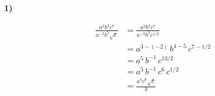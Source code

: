 \documentclass[11pt,a4paper,fleqn]{article}
\begin{document}
\textbf{1)}

\begin{align*}
  \frac{a^{3}b^{4}c^{7}}{a^{-2}b^{5}\sqrt{c}}
    &= \frac{a^{3}b^{4}c^{7}}{a^{-2}b^{5}c^{1/2}} \\
    &= a^{3-(-2)}\, b^{4-5}\, c^{7-1/2} \\
    &= a^{5}\, b^{-1}\, c^{13/2} \\
    &= a^{5}\, b^{-1}\, c^{6}\, c^{1/2} \\
    &= \frac{a^{5}c^{6}\sqrt{c}}{b}
\end{align*}
\end{document}
